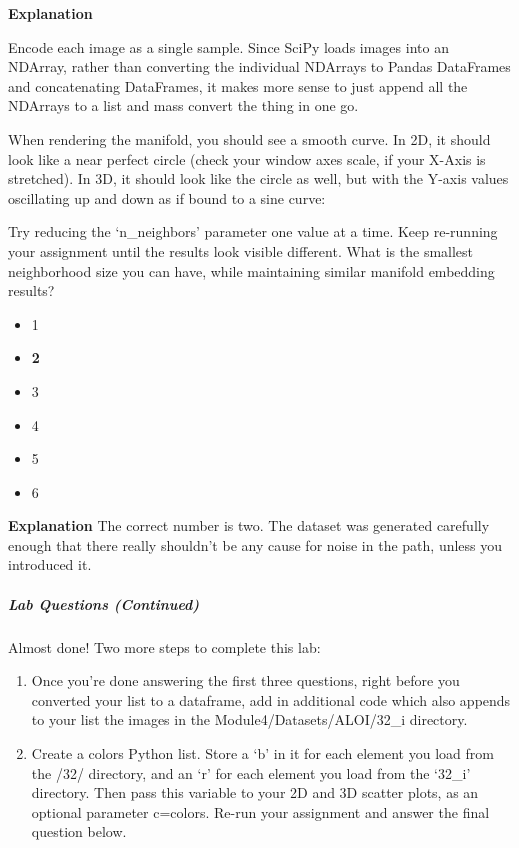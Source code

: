 \documentclass[11pt]{article}
\providecommand{\tightlist}{%
      \setlength{\itemsep}{0pt}\setlength{\parskip}{0pt}}
\begin{document}
\textbf{Explanation}

Encode each image as a single sample. Since SciPy loads images into an
NDArray, rather than converting the individual NDArrays to Pandas
DataFrames and concatenating DataFrames, it makes more sense to just
append all the NDArrays to a list and mass convert the thing in one go.

When rendering the manifold, you should see a smooth curve. In 2D, it
should look like a near perfect circle (check your window axes scale, if
your X-Axis is stretched). In 3D, it should look like the circle as
well, but with the Y-axis values oscillating up and down as if bound to
a sine curve:

Try reducing the `n\_neighbors' parameter one value at a time. Keep
re-running your assignment until the results look visible different.
What is the smallest neighborhood size you can have, while maintaining
similar manifold embedding results?

\begin{itemize}
\tightlist
\item
  1
\item
  \textbf{2}
\item
  3
\item
  4
\item
  5
\item
  6
\end{itemize}

\textbf{Explanation} The correct number is two. The dataset was
generated carefully enough that there really shouldn't be any cause for
noise in the path, unless you introduced it.

\hypertarget{lab-questions-continued}{%
\subparagraph{Lab Questions (Continued)}\label{lab-questions-continued}}

Almost done! Two more steps to complete this lab:

\begin{enumerate}
\def\labelenumi{\arabic{enumi}.}
\tightlist
\item
  Once you're done answering the first three questions, right before you
  converted your list to a dataframe, add in additional code which also
  appends to your list the images in the Module4/Datasets/ALOI/32\_i
  directory.
\item
  Create a colors Python list. Store a `b' in it for each element you
  load from the /32/ directory, and an `r' for each element you load
  from the `32\_i' directory. Then pass this variable to your 2D and 3D
  scatter plots, as an optional parameter c=colors. Re-run your
  assignment and answer the final question below.
\end{enumerate}
\end{document}
